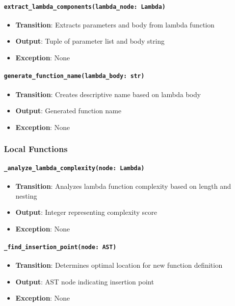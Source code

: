 \documentclass[12pt, titlepage]{article}
\begin{document}
\paragraph{\texttt{extract\_lambda\_components(lambda\_node: Lambda)}}
\begin{itemize}
  \item \textbf{Transition}: Extracts parameters and body from lambda function
  \item \textbf{Output}: Tuple of parameter list and body string
  \item \textbf{Exception}: None
\end{itemize}

\paragraph{\texttt{generate\_function\_name(lambda\_body: str)}}
\begin{itemize}
  \item \textbf{Transition}: Creates descriptive name based on lambda body
  \item \textbf{Output}: Generated function name
  \item \textbf{Exception}: None
\end{itemize}

\subsubsection{Local Functions}

\paragraph{\texttt{\_analyze\_lambda\_complexity(node: Lambda)}}
\begin{itemize}
  \item \textbf{Transition}: Analyzes lambda function complexity based on length and nesting
  \item \textbf{Output}: Integer representing complexity score
  \item \textbf{Exception}: None
\end{itemize}

\paragraph{\texttt{\_find\_insertion\_point(node: AST)}}
\begin{itemize}
  \item \textbf{Transition}: Determines optimal location for new function definition
  \item \textbf{Output}: AST node indicating insertion point
  \item \textbf{Exception}: None
\end{itemize}
\end{document}
